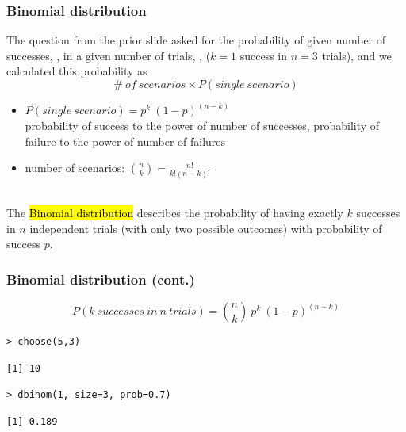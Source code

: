 \documentclass[slidestop,compress,mathserif,12pt,t,professionalfonts,xcolor=table]{beamer}
\begin{document}

\begin{frame}
\frametitle{Binomial distribution}

The question from the prior slide asked for the probability of given number of successes, , in a given number of trials, , ($k = 1$ success in $n = 3$ trials), and we calculated this probability as
\[ \#~of~scenarios \times P(single~scenario) \]

\pause

\begin{itemize}

\item $P(single~scenario) = p^k~(1-p)^{(n-k)}$ \\
{\tiny probability of success to the power of number of successes, probability of failure to the power of number of failures}

\pause

\item number of scenarios: ${n \choose k} = \frac{n!}{k! (n - k)!}$

\end{itemize}

\pause
$\:$ \\

The \hl{Binomial distribution} describes the probability of having exactly $k$
successes in $n$ independent trials 
(with only two possible outcomes) 
with probability of success $p$.

\end{frame}


\begin{frame}[fragile]
\frametitle{Binomial distribution (cont.)}

\[P(k~successes~in~n~trials) = {n \choose k}~p^k~(1-p)^{(n-k)} \] 

\pause

{\footnotesize
\begin{Verbatim}[frame=single, formatcom=\color{blue}]
> choose(5,3)
\end{Verbatim}
}
{\footnotesize
\begin{Verbatim}[frame=single, formatcom=\color{gray}]
[1] 10
\end{Verbatim}
}
\pause
{}
{\footnotesize
\begin{Verbatim}[frame=single, formatcom=\color{blue}]
> dbinom(1, size=3, prob=0.7)
\end{Verbatim}
}
{\footnotesize
\begin{Verbatim}[frame=single, formatcom=\color{gray}]
[1] 0.189
\end{Verbatim}
}

\end{frame}
\end{document}
